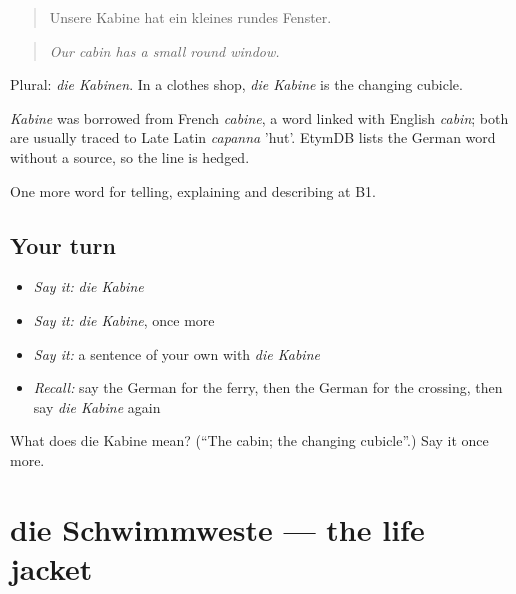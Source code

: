\begin{quote}
Unsere Kabine hat ein kleines rundes Fenster.
\end{quote}

\begin{quote}
\emph{Our cabin has a small round window.}
\end{quote}

Plural: \emph{die Kabinen}. In a clothes shop, \emph{die Kabine} is the changing cubicle.

\begin{cousinweb}
\emph{Kabine} was borrowed from French \emph{cabine}, a word linked with English \emph{cabin}; both are usually traced to Late Latin \emph{capanna} 'hut'. EtymDB lists the German word without a source, so the line is hedged.
\end{cousinweb}

\begin{grammarlens}[title={What you've built}]
One more word for telling, explaining and describing at B1.
\end{grammarlens}

\subsection*{Your turn}
\begin{itemize}
\raggedright
  \item \emph{Say it:} \emph{die Kabine}
  \item \emph{Say it:} \emph{die Kabine}, once more
  \item \emph{Say it:} a sentence of your own with \emph{die Kabine}
  \item \emph{Recall:} say the German for the ferry, then the German for the crossing, then say \emph{die Kabine} again
\end{itemize}

\begin{tcolorbox}[breakable,colback=teal!4,colframe=teal!35!black,title={Before you move on}]
What does die Kabine mean? (\textquotedblleft{}The cabin; the changing cubicle\textquotedblright{}.) Say it once more.
\end{tcolorbox}
\section[die Schwimmweste]{die Schwimmweste — the life jacket}

\label{lesson:GE-C421-schwimmweste}



